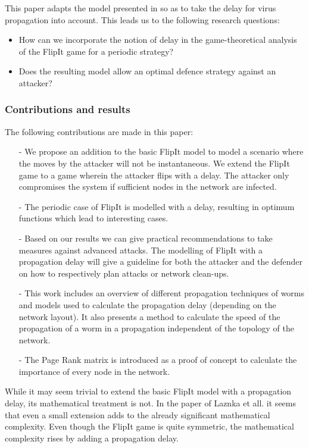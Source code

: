 This paper adapts the model presented in \cite{FlipIt} so as to take the delay for virus propagation into account.
This leads us to the following research questions:
\begin{itemize}
\item How can we incorporate the notion of delay in the game-theoretical analysis of the FlipIt game for a periodic strategy?
\item Does the resulting model allow an optimal defence strategy against an attacker? 
\end{itemize}

\subsubsection{Contributions and results}
The following contributions are made in this paper:
\begin{itemize}
\item[-] We propose an addition to the basic FlipIt model to model a scenario where the moves by the attacker will not be instantaneous. We extend the FlipIt game to a game wherein the attacker flips with a delay. The attacker only compromises the system if sufficient nodes in the network are infected. 
\item[-] The periodic case of FlipIt is modelled with a delay, resulting in optimum functions which lead to interesting cases. 
\item[-] Based on our results we can give practical recommendations to take measures against advanced attacks.  The modelling of FlipIt with a propagation delay will give a guideline for both the attacker and the defender on how to respectively plan attacks or network clean-ups.
\item[-] This work includes an overview of different propagation techniques of worms and models used to calculate the propagation delay (depending on the network layout). It also presents a method to calculate the speed of the propagation of a worm in a propagation independent of the topology of the network.
\item[-] The Page Rank matrix is introduced as a proof of concept to calculate the importance of every node in the network.
\end{itemize}


While it may seem trivial to extend the basic FlipIt model with a propagation delay, its mathematical treatment is not. In the paper of Laznka et all. \citep{FlipThem} it seems that even a small extension adds to the already significant mathematical complexity. Even though the FlipIt game is quite symmetric, the mathematical complexity rises by adding a propagation delay.

